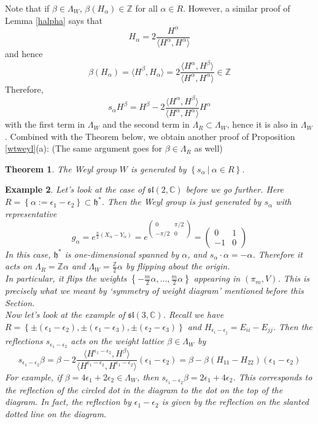 \documentclass[11pt]{article}
\newtheorem{theorem}{Theorem}[section]
\newtheorem{example}[theorem]{Example}
\newcommand{\bb}[1]{\mathbb{#1}}
\newcommand{\mf}[1]{\mathfrak{#1}}
\begin{document}
\noindent Note that if $\beta \in \Lambda_W$, $\beta(H_{\alpha}) \in \bb{Z}$ for all $\alpha \in R$. However, a similar proof of Lemma \ref{halpha} says that
$$H_{\alpha} = 2\frac{H^{\alpha}}{ \langle H^{\alpha}, H^{\alpha} \rangle}$$
and hence
$$\beta(H_{\alpha}) = \langle H^{\beta}, H_{\alpha} \rangle = 2\frac{\langle H^{\alpha}, H^{\beta} \rangle}{ \langle H^{\alpha}, H^{\alpha} \rangle} \in \bb{Z}$$
Therefore,
$$s_{\alpha}H^{\beta} = H^{\beta} - 2\frac{\langle H^{\alpha}, H^{\beta} \rangle}{ \langle H^{\alpha}, H^{\alpha} \rangle} H^{\alpha}$$
with the first term in $\Lambda_W$ and the second term in $\Lambda_R \subset \Lambda_W$, hence it is also in $\Lambda_W$. Combined with the Theorem below, we obtain another proof of Proposition \ref{wtweyl}(a): (The same argument goes for $\beta \in \Lambda_R$ as well)
\begin{theorem}
The Weyl group $W$ is generated by $\left\{ s_{\alpha}\ \Big|\ \alpha \in R\right\}$.
\end{theorem}
\begin{example}
Let's look at the case of $\mf{sl}(2,\bb{C})$ before we go further. Here $R = \left\{ \alpha := \epsilon_1 - \epsilon_2 \right\} \subset \mf{h}^*$. Then the Weyl group is just generated by $s_{\alpha}$ with representative
$$g_{\alpha} = e^{\frac{\pi}{2}(X_{\alpha} - Y_{\alpha})} = e^{\left( \begin{array}{cc}
 0 & \pi/2\\
-\pi/2 & 0 \end{array} \right)} = \left( \begin{array}{cc}
 0 & 1\\
-1 & 0 \end{array} \right)$$
In this case, $\mf{h}^*$ is one-dimensional spanned by $\alpha$, and $s_{\alpha}\cdot \alpha = -\alpha$. Therefore it acts on $\Lambda_R = \bb{Z}\alpha$ and $\Lambda_W = \frac{\bb{Z}}{2}\alpha$ by flipping about the origin.\\
In particular, it flips the weights $\left\{-\frac{m}{2}\alpha,\dots,\frac{m}{2}\alpha\right\}$ appearing in $(\pi_m,V)$. This is precisely what we meant by `symmetry of weight diagram' mentioned before this Section.\\

\noindent Now let's look at the example of $\mf{sl}(3,\bb{C})$. Recall we have $R = \left\{\pm(\epsilon_1 - \epsilon_2), \pm(\epsilon_1 - \epsilon_3), \pm(\epsilon_2 - \epsilon_3)\right\}$ and $H_{\epsilon_i - \epsilon_j} = E_{ii} - E_{jj}$. Then the reflections $s_{\epsilon_1 - \epsilon_2}$ acts on the weight lattice $\beta \in \Lambda_W$ by
$$s_{\epsilon_1 - \epsilon_2} \beta = \beta - 2\frac{\langle H^{\epsilon_1 - \epsilon_2}, H^{\beta} \rangle}{\langle H^{\epsilon_1 - \epsilon_2}, H^{\epsilon_1 - \epsilon_2} \rangle} (\epsilon_1 - \epsilon_2) = \beta - \beta(H_{11} - H_{22})(\epsilon_1 - \epsilon_2)$$
For example, if $\beta = 4\epsilon_1 + 2\epsilon_2 \in \Lambda_W$, then $s_{\epsilon_1 - \epsilon_2} \beta = 2\epsilon_1 + 4\epsilon_2$. This corresponds to the reflection of the circled dot in the diagram to the dot on the top of the diagram. In fact, the reflection by $\epsilon_1 - \epsilon_2$ is given by the reflection on the slanted dotted line on the diagram.
\end{example}
\end{document}
